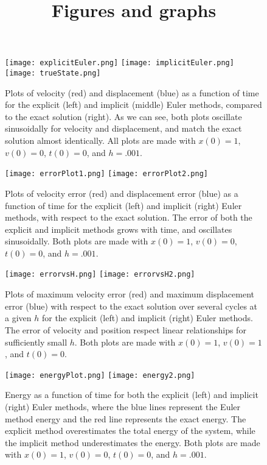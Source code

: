 \documentclass[11pt, oneside]{article}   	%
\begin{document}
\begin{section}
\title{\textbf{Figures and graphs}}
\maketitle

\begin{figure}[H]
\texttt{[image: explicitEuler.png]}
\texttt{[image: implicitEuler.png]}
\texttt{[image: trueState.png]}
\caption{Plots of velocity (red) and displacement (blue) as a function of time for the explicit (left) and implicit (middle) Euler methods, compared to the exact solution (right). As we can see, both plots oscillate sinusoidally for velocity and displacement, and match the exact solution almost identically. All plots are made with $x(0) = 1$, $v(0) = 0$, $t(0) = 0$, and $h = .001$.}
\end{figure}

\begin{figure}[H]
\texttt{[image: errorPlot1.png]}
\texttt{[image: errorPlot2.png]}
\caption{Plots of velocity error (red) and displacement error (blue) as a function of time for the explicit (left) and implicit (right) Euler methods, with respect to the exact solution. The error of both the explicit and implicit methods grows with time, and oscillates sinusoidally. Both plots are made with $x(0) = 1$, $v(0) = 0$, $t(0) = 0$, and $h = .001$.}
\end{figure}

\begin{figure}[H]
\texttt{[image: errorvsH.png]}
\texttt{[image: errorvsH2.png]}
\caption{Plots of maximum velocity error (red) and maximum displacement error (blue) with respect to the exact solution over several cycles at a given $h$ for the explicit (left) and implicit (right) Euler methods. The error of velocity and position respect linear relationships for sufficiently small $h$. Both plots are made with $x(0) = 1$, $v(0) = 1$, and $t(0) = 0$.}
\end{figure}

\begin{figure}[H]
\texttt{[image: energyPlot.png]}
\texttt{[image: energy2.png]}
\caption{Energy as a function of time for both the explicit (left) and implicit (right) Euler methods, where the blue lines represent the Euler method energy and the red line represents the exact energy. The explicit method overestimates the total energy of the system, while the implicit method underestimates the energy. Both plots are made with $x(0) = 1$, $v(0) = 0$, $t(0) = 0$, and $h = .001$.}
\end{figure}


\end{section}
\end{document}
